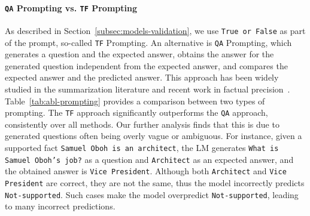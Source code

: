 \documentclass[11pt]{article}
\newcommand{\nsLabel}{\texttt{Not-supported}}
\begin{document}
\paragraph{\texttt{QA} Prompting vs. \texttt{TF} Prompting}
As described in Section~\ref{subsec:models-validation}, we use \texttt{True or False} as part of the prompt, so-called \texttt{TF} Prompting. An alternative is \texttt{QA} Prompting, which generates a question and the expected answer, obtains the answer for the generated question independent from the expected answer, and compares the expected answer and the predicted answer. This approach has been widely studied in the summarization literature and recent work in factual precision~\citep{kryscinski2019evaluating,wang2020asking,gao2022attributed,manakul2023selfcheckgpt}.
Table~\ref{tab:abl-prompting} provides a comparison between two types of prompting.
The \texttt{TF} approach significantly outperforms the \texttt{QA} approach, consistently over all methods. Our further analysis finds that this is due to generated questions often being overly vague or ambiguous. For instance, given a supported fact \texttt{Samuel Oboh is an architect}, the LM generates \texttt{What is Samuel Oboh's job?} as a question and \texttt{Architect} as an expected answer, and the obtained answer is \texttt{Vice President}. Although both \texttt{Architect} and \texttt{Vice President} are correct, they are not the same, thus the model incorrectly predicts \nsLabel.
Such cases make the model overpredict \nsLabel, leading to many incorrect predictions.
\end{document}
